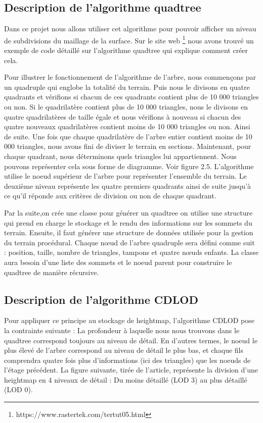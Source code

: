 \documentclass[12pt]{report}
\begin{document}
\subsection{Description de l'algorithme quadtree}
Dans ce projet nous allons utiliser cet algorithme pour pouvoir afficher un niveau de subdivisions du maillage de la surface. Sur le site web \footnote{https://www.rastertek.com/tertut05.html} nous avons trouvé un exemple de code détaillé sur l'algorithme quadtree qui explique comment créer cela.

Pour illustrer le fonctionnement de l'algorithme de l'arbre, nous commençons par un quadruple qui englobe la totalité du terrain.
 Puis nous le divisons en quatre quadrants et vérifions si chacun de ces quadrants contient plus de 10 000 triangles ou non. Si le quadrilatère contient plus de 10 000 triangles, nous le divisons en quatre quadrilatères de taille égale et nous vérifions à nouveau si chacun des quatre nouveaux quadrilatères contient moins de 10 000 triangles ou non. Ainsi de suite. Une fois que chaque quadrilatère de l'arbre entier contient moins de 10 000 triangles, nous avons fini de diviser le terrain en sections. Maintenant, pour chaque quadrant, nous déterminons quels triangles lui appartiennent. Nous pouvons représenter cela sous forme de diagramme. Voir figure 2.5. L'algorithme utilise le noeud supérieur de l'arbre pour représenter l'ensemble du terrain. Le deuxième niveau représente les quatre premiers quadrants ainsi de suite jusqu'à ce qu'il réponde aux critères de division ou non de chaque quadrant.

Par la suite,on crée une classe pour générer un quadtree on utilise une structure qui prend en charge le stockage et le rendu des informations sur les sommets du terrain.
Ensuite, il faut générer une structure de données utilisée pour la gestion du terrain procédural. Chaque nœud de l'arbre quadruple sera défini comme suit : position, taille, nombre de triangles, tampons et quatre nœuds enfants.
La classe aura besoin d'une liste des sommets et le noeud parent pour construire le quadtree de manière récursive.


\subsection{Description de l'algorithme CDLOD}

Pour appliquer ce principe au stockage de heightmap, l'algorithme CDLOD pose la contrainte suivante : La profondeur à laquelle nous nous trouvons dans le quadtree correspond toujours au niveau de détail. En d'autres termes, le noeud le plus élevé de l'arbre correspond au niveau de détail le plus bas, et chaque fils comprendra quatre fois plus d'informations (ici des triangles) que les noeuds de l'étage précédent. La figure suivante, tirée de l'article, représente la division d'une heightmap en 4 niveaux de détail : Du moins détaillé (LOD 3) au plus détaillé (LOD 0).
\end{document}
